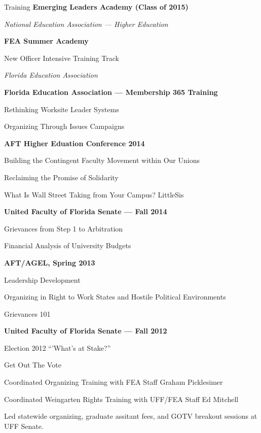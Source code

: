 \begin{rubric}{Training}
\textbf{Emerging Leaders Academy (Class of 2015)} \par \textit{National Education Association {---} Higher Education}

\entry*[June 2014]
\textbf{FEA Summer Academy} \par New Officer Intensive Training Track \par \textit{Florida Education Association}



\entry*[April 2014]
\textbf{Florida Education Association {---} Membership 365 Training} \par 
Rethinking Worksite Leader Systems \par Organizing Through Issues Campaigns

\entry*[April 2014]
\textbf{AFT Higher Eduation Conference 2014} \par
Building the Contingent Faculty Movement within Our Unions \par Reclaiming the Promise of Solidarity \par What Is Wall Street Taking from Your Campus? LittleSis

\entry*[September 2013]
\textbf{United Faculty of Florida Senate {---} Fall 2014} \par
Grievances from Step 1 to Arbitration \par Financial Analysis of University Budgets

\entry*[April 2013]
\textbf{AFT/AGEL, Spring 2013} \par
Leadership Development \par Organizing in Right to Work States and Hostile Political Environments \par Grievances 101

\entry*[September 2012]
\textbf{United Faculty of Florida Senate {---} Fall 2012} \par
Election 2012 ``'What's at Stake?'' \par Get Out The Vote

\entry*[August 2013]
Coordinated Organizing Training with FEA Staff Graham Picklesimer

\entry*[February 2014]
Coordinated Weingarten Rights Training with UFF/FEA Staff Ed Mitchell

\entry*[February 2014]
Led statewide organizing, graduate assitant fees, and GOTV breakout sessions at UFF Senate.

\end{rubric}
